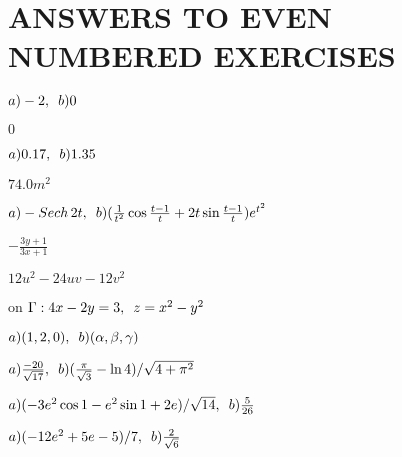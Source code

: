 \documentclass[11pt]{amsbook}
\begin{document}
\section*{ANSWERS TO EVEN NUMBERED EXERCISES}
\setcounter{exercise}{15}
\begin{exercise}
	$a) -2, \enskip b) 0$
\end{exercise}
\addtocounter{exercise}{5}
\begin{exercise}
	$0$
\end{exercise}
\addtocounter{exercise}{1}
\begin{exercise}
	$a) 0.17, \enskip b) 1.35$
\end{exercise}
\addtocounter{exercise}{1}
\begin{exercise}
	$74.0 m^2$
\end{exercise}
\addtocounter{exercise}{1}
\begin{exercise}
	$a) -Sech\,2t, \enskip b) (\frac{1}{t^2} \cos{\frac{t-1}{t}} + 2t\sin{\frac{t-1}{t}}) e^{t^2}$
\end{exercise}
\addtocounter{exercise}{3}
\begin{exercise}
	$-\frac{3y+1}{3x+1}$
\end{exercise}
\addtocounter{exercise}{5}
\begin{exercise}
	$12u^2 - 24uv -12v^2$
\end{exercise}
\addtocounter{exercise}{7}
\begin{exercise}
	on $\Gamma : 4x-2y=3, \enskip z=x^2-y^2$
\end{exercise}
\addtocounter{exercise}{1}
\begin{exercise}
	$a) (1,2,0), \enskip b) (\alpha, \beta, \gamma)$
\end{exercise}
\addtocounter{exercise}{1}
\begin{exercise}
	$a) \frac{-20}{\sqrt{17}}, \enskip b) (\frac{\pi}{\sqrt{3}} - \ln{4}) / \sqrt{4 + \pi^2}$
\end{exercise}
\addtocounter{exercise}{1}
\begin{exercise}
	$a) (-3e^2\cos{1}-e^2\sin{1}+2e)/\sqrt{14}, \enskip b) \frac{5}{26}$
\end{exercise}
\addtocounter{exercise}{1}
\begin{exercise}
	$a) (-12e^2 + 5e - 5)/7, \enskip b) \frac{2}{\sqrt{6}}$
\end{exercise}
\end{document}
